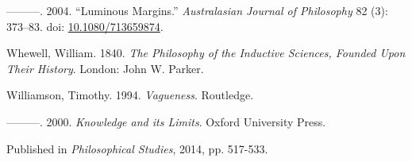 \documentclass[
  10pt,
  letterpaper,
  DIV=11,
  numbers=noendperiod,
  twoside]{scrartcl}
\newlength{\cslhangindent}
\newenvironment{CSLReferences}[2] %
 {\begin{list}{}{%
  \setlength{\itemindent}{0pt}
  \setlength{\leftmargin}{0pt}
  \setlength{\parsep}{0pt}
  \ifodd #1
   \setlength{\leftmargin}{\cslhangindent}
   \setlength{\itemindent}{-1\cslhangindent}
  \fi
  \setlength{\itemsep}{#2\baselineskip}}}
 {\end{list}}
\begin{document}
\begin{CSLReferences}{1}{0}
---------. 2004. {``Luminous Margins.''} \emph{Australasian Journal of
Philosophy} 82 (3): 373--83. doi:
\href{https://doi.org/10.1080/713659874}{10.1080/713659874}.

Whewell, William. 1840. \emph{The Philosophy of the Inductive Sciences,
Founded Upon Their History}. London: John W. Parker.

Williamson, Timothy. 1994. \emph{{Vagueness}}. Routledge.

---------. 2000. \emph{{Knowledge and its Limits}}. Oxford University
Press.

\end{CSLReferences}



\noindent Published in\emph{
Philosophical Studies}, 2014, pp. 517-533.
\end{document}
